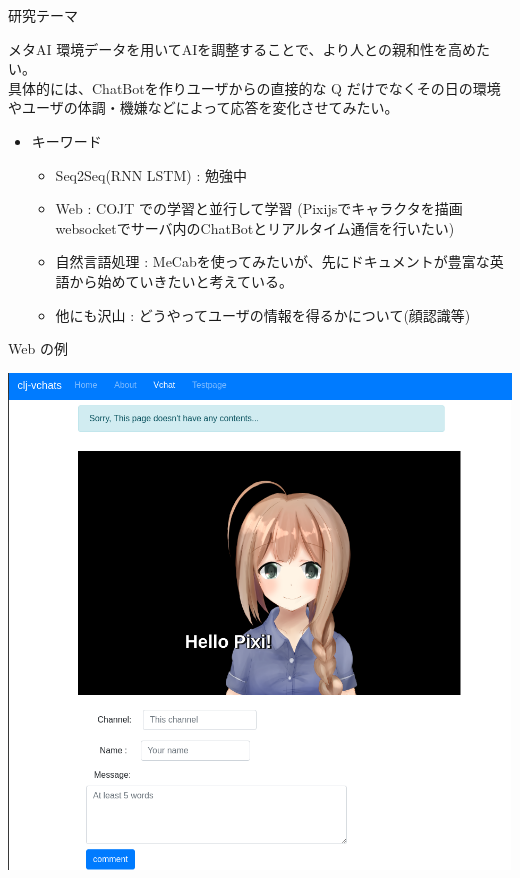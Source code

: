 \documentclass[dvipdfmx,10pt,presentation]{beamer}
\begin{document}
\begin{frame}[allowframebreaks]{研究テーマ}
\begin{block}{メタAI}
環境データを用いてAIを調整することで、より人との親和性を高めたい。\\
具体的には、ChatBotを作りユーザからの直接的な Q だけでなくその日の環境やユーザの体調・機嫌などによって応答を変化させてみたい。\\
\begin{itemize}
\item キーワード\\
\begin{itemize}
\item Seq2Seq(RNN LSTM) : 勉強中\\
\item Web : COJT での学習と並行して学習 (Pixijsでキャラクタを描画 websocketでサーバ内のChatBotとリアルタイム通信を行いたい)\\
\item 自然言語処理 : MeCabを使ってみたいが、先にドキュメントが豊富な英語から始めていきたいと考えている。\\
\item 他にも沢山 : どうやってユーザの情報を得るかについて(顔認識等)\\
\end{itemize}
\end{itemize}
\end{block}
\begin{block}{Web の例}
\begin{center}
\includegraphics[width=0.7\linewidth]{./screen.png}
\end{center}
\end{block}
\end{frame}
\end{document}
